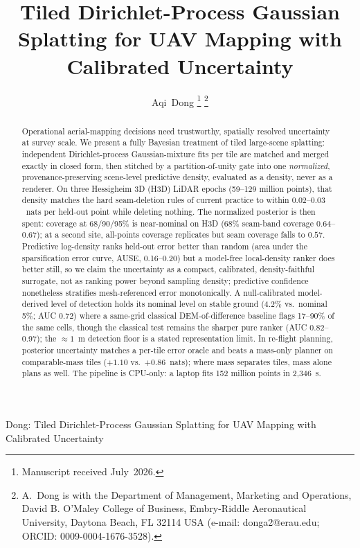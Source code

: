 \documentclass[journal]{IEEEtran}
\begin{document}

\title{Tiled Dirichlet-Process Gaussian Splatting for UAV Mapping with
Calibrated Uncertainty}

\author{Aqi~Dong%
\thanks{Manuscript received July~2026.}%
\thanks{A.~Dong is with the Department of Management, Marketing and
Operations, David B. O'Maley College of Business, Embry-Riddle Aeronautical
University, Daytona Beach, FL 32114 USA (e-mail: donga2@erau.edu;
ORCID: 0009-0004-1676-3528).}}

%
{Dong: Tiled Dirichlet-Process Gaussian Splatting for UAV Mapping with Calibrated Uncertainty}

\maketitle

\begin{abstract}
 Operational aerial-mapping decisions need trustworthy,
spatially resolved uncertainty at survey scale. We present a fully Bayesian treatment of tiled
large-scene splatting: independent Dirichlet-process Gaussian-mixture fits
per tile are matched and merged exactly in closed form, then
stitched by a partition-of-unity
gate into one \emph{normalized}, provenance-preserving scene-level
predictive density, evaluated as a density, never as a
renderer. On three Hessigheim 3D (H3D)
LiDAR epochs (59--129 million points), that density matches the hard
seam-deletion rules of current practice to within
$0.02$--$0.03$~nats per held-out point
while deleting nothing. The normalized posterior is then spent:
coverage at 68/90/95\% is near-nominal on
H3D (68\% seam-band coverage $0.64$--$0.67$); at a second site,
all-points coverage replicates
but seam coverage falls to $0.57$. Predictive
log-density ranks held-out error better than random
(area under the sparsification error curve, AUSE, 0.16--0.20) but a model-free local-density ranker does better
still, so we claim the uncertainty as a
compact, calibrated, density-faithful surrogate, not as ranking
power beyond sampling density; predictive confidence nonetheless
stratifies mesh-referenced error monotonically. A
null-calibrated model-derived level of detection holds its
nominal level on stable ground (4.2\% vs.\ nominal 5\%;
AUC 0.72) where a same-grid classical DEM-of-difference
baseline flags 17--90\% of the same cells, though the
classical test remains the sharper pure ranker (AUC 0.82--0.97); the
${\approx}1$~m detection floor is a stated representation limit. In
re-flight planning, posterior uncertainty matches a per-tile error
oracle and beats a mass-only planner on comparable-mass tiles
($+1.10$ vs.\ $+0.86$~nats); where mass separates tiles, mass alone
plans as well. The pipeline is CPU-only: a laptop fits
152 million points in 2{,}346~s.
\end{abstract}
\end{document}
